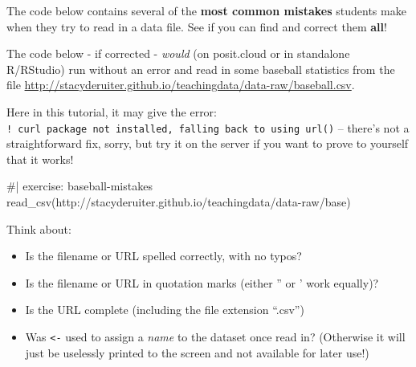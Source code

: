 \documentclass[
  letterpaper,
  DIV=11,
  numbers=noendperiod]{scrreprt}
\newenvironment{Shaded}{\begin{snugshade}}{\end{snugshade}}
\newcommand{\NormalTok}[1]{\textcolor[rgb]{0.00,0.23,0.31}{#1}}
\providecommand{\tightlist}{%
  \setlength{\itemsep}{0pt}\setlength{\parskip}{0pt}}\usepackage{longtable,booktabs,array}
\theoremstyle{remark}
\begin{document}
The code below contains several of the \textbf{most common mistakes}
students make when they try to read in a data file. See if you can find
and correct them \textbf{all}!

The code below - if corrected - \emph{would} (on posit.cloud or in
standalone R/RStudio) run without an error and read in some baseball
statistics from the file
\url{http://stacyderuiter.github.io/teachingdata/data-raw/baseball.csv}.

Here in this tutorial, it may give the error:
\texttt{!\ curl\ package\ not\ installed,\ falling\ back\ to\ using\ url()}
-- there's not a straightforward fix, sorry, but try it on the server if
you want to prove to yourself that it works!

\begin{Shaded}
\begin{Highlighting}[]
\NormalTok{\#| exercise: baseball{-}mistakes}
\NormalTok{read\_csv(http://stacyderuiter.github.io/teachingdata/data{-}raw/base)}
\end{Highlighting}
\end{Shaded}

\begin{tcolorbox}[enhanced jigsaw, colbacktitle=quarto-callout-note-color!10!white, opacitybacktitle=0.6, titlerule=0mm, left=2mm, leftrule=.75mm, toptitle=1mm, toprule=.15mm, rightrule=.15mm, title=\textcolor{quarto-callout-note-color}{\faInfo}\hspace{0.5em}{Hints}, colback=white, arc=.35mm, colframe=quarto-callout-note-color-frame, bottomrule=.15mm, breakable, bottomtitle=1mm, opacityback=0, coltitle=black]

Think about:

\begin{itemize}
\tightlist
\item
  Is the filename or URL spelled correctly, with no typos?
\item
  Is the filename or URL in quotation marks (either '' or ' work
  equally)?
\item
  Is the URL complete (including the file extension ``.csv'')
\item
  Was \texttt{\textless{}-} used to assign a \emph{name} to the dataset
  once read in? (Otherwise it will just be uselessly printed to the
  screen and not available for later use!)
\end{itemize}

\end{tcolorbox}
\end{document}
